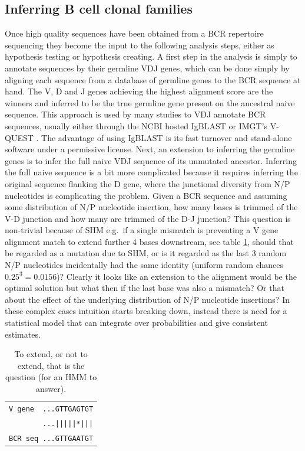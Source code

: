 \subsection{Inferring B cell clonal families}
Once high quality sequences have been obtained from a BCR repertoire sequencing they become the input to the following analysis steps, either as hypothesis testing or hypothesis creating.
A first step in the analysis is simply to annotate sequences by their germline VDJ genes, which can be done simply by aligning each sequence from a database of germline genes to the BCR sequence at hand.
The V, D and J genes achieving the highest alignment score are the winners and inferred to be the true germline gene present on the ancestral naive sequence.
This approach is used by many studies to VDJ annotate BCR sequences, usually either through the NCBI hosted IgBLAST \cite{ye2013igblast} or IMGT's V-QUEST \cite{li2013imgt}.
The advantage of using IgBLAST is its fast turnover and stand-alone software under a permissive license.
Next, an extension to inferring the germline genes is to infer the full naive VDJ sequence of its unmutated ancestor.
Inferring the full naive sequence is a bit more complicated because it requires inferring the original sequence flanking the D gene, where the junctional diversity from N/P nucleotides is complicating the problem.
Given a BCR sequence and assuming some distribution of N/P nucleotide insertion, how many bases is trimmed of the V-D junction and how many are trimmed of the D-J junction?
This question is non-trivial because of SHM e.g.\ if a single mismatch is preventing a V gene alignment match to extend further 4 bases downstream, see table \ref{extend_or_not}, should that be regarded as a mutation due to SHM, or is it regarded as the last 3 random N/P nucleotides incidentally had the same identity (uniform random chances $0.25^3=0.0156$)?
Clearly it looks like an extension to the alignment would be the optimal solution but what then if the last base was also a mismatch? Or that about the effect of the underlying distribution of N/P nucleotide insertions?
In these complex cases intuition starts breaking down, instead there is need for a statistical model that can integrate over probabilities and give consistent estimates.
\begin{table}[ht]
\centering
\begin{tabular}{l}
\texttt{V gene \ ...GTTGAGTGT} \\
\texttt{\ \ \ \ \ \ \ \ ...|||||*|||} \\
\texttt{BCR seq ...GTTGAATGT}
\end{tabular}
\caption{To extend, or not to extend, that is the question (for an HMM to answer).}
\label{extend_or_not}
\end{table}

